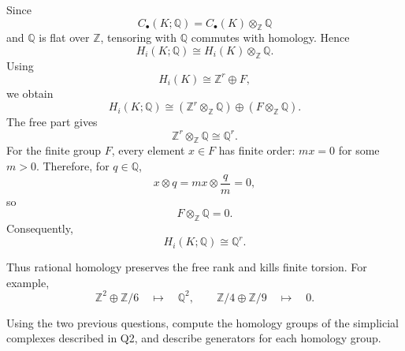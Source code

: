 \begin{solution}
Since
\[
C_\bullet(K;\mathbb Q)
=
C_\bullet(K)\otimes_{\mathbb Z}\mathbb Q
\]
and \(\mathbb Q\) is flat over \(\mathbb Z\), tensoring with \(\mathbb Q\)
commutes with homology. Hence
\[
H_i(K;\mathbb Q)
\cong
H_i(K)\otimes_{\mathbb Z}\mathbb Q.
\]
Using
\[
H_i(K)\cong \mathbb Z^r\oplus F,
\]
we obtain
\[
H_i(K;\mathbb Q)
\cong
(\mathbb Z^r\otimes_{\mathbb Z}\mathbb Q)
\oplus
(F\otimes_{\mathbb Z}\mathbb Q).
\]
The free part gives
\[
\mathbb Z^r\otimes_{\mathbb Z}\mathbb Q\cong\mathbb Q^r.
\]
For the finite group \(F\), every element \(x\in F\) has finite order:
\(mx=0\) for some \(m>0\). Therefore, for \(q\in\mathbb Q\),
\[
x\otimes q
=
mx\otimes\frac qm
=
0,
\]
so
\[
F\otimes_{\mathbb Z}\mathbb Q=0.
\]
Consequently,
\[
\boxed{H_i(K;\mathbb Q)\cong\mathbb Q^r.}
\]

Thus rational homology preserves the free rank and kills finite torsion.
For example,
\[
\mathbb Z^2\oplus\mathbb Z/6
\quad\longmapsto\quad
\mathbb Q^2,
\qquad
\mathbb Z/4\oplus\mathbb Z/9
\quad\longmapsto\quad
0.
\]
\end{solution}

\begin{problem}
Using the two previous questions, compute the homology groups of the simplicial complexes described in Q2, and describe generators for each homology group.
\end{problem}

